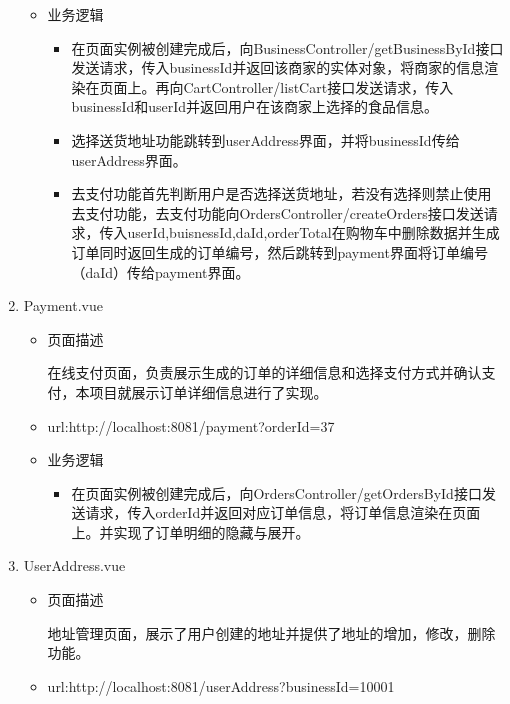 \begin{enumerate}
\begin{itemize}
    \item 业务逻辑
    \begin{itemize}
      \item 在页面实例被创建完成后，向BusinessController/getBusinessById接口发送请求，传入businessId并返回该商家的实体对象，将商家的信息渲染在页面上。再向CartController/listCart接口发送请求，传入businessId和userId并返回用户在该商家上选择的食品信息。
      \item 选择送货地址功能跳转到userAddress界面，并将businessId传给userAddress界面。
      \item 去支付功能首先判断用户是否选择送货地址，若没有选择则禁止使用去支付功能，去支付功能向OrdersController/createOrders接口发送请求，传入userId,buisnessId,daId,orderTotal在购物车中删除数据并生成订单同时返回生成的订单编号，然后跳转到payment界面将订单编号（daId）传给payment界面。
      \end{itemize}
  \end{itemize}

  \item Payment.vue
  \begin{itemize}
    \item 页面描述
    
    在线支付页面，负责展示生成的订单的详细信息和选择支付方式并确认支付，本项目就展示订单详细信息进行了实现。

    \item url:http://localhost:8081/payment?orderId=37
    
    \item 业务逻辑
    \begin{itemize}
      \item 在页面实例被创建完成后，向OrdersController/getOrdersById接口发送请求，传入orderId并返回对应订单信息，将订单信息渲染在页面上。并实现了订单明细的隐藏与展开。
      \end{itemize}
  \end{itemize}

  \item UserAddress.vue
  \begin{itemize}
    \item 页面描述
    
    地址管理页面，展示了用户创建的地址并提供了地址的增加，修改，删除功能。

    \item url:http://localhost:8081/userAddress?businessId=10001
    

\end{itemize}
\end{enumerate}
